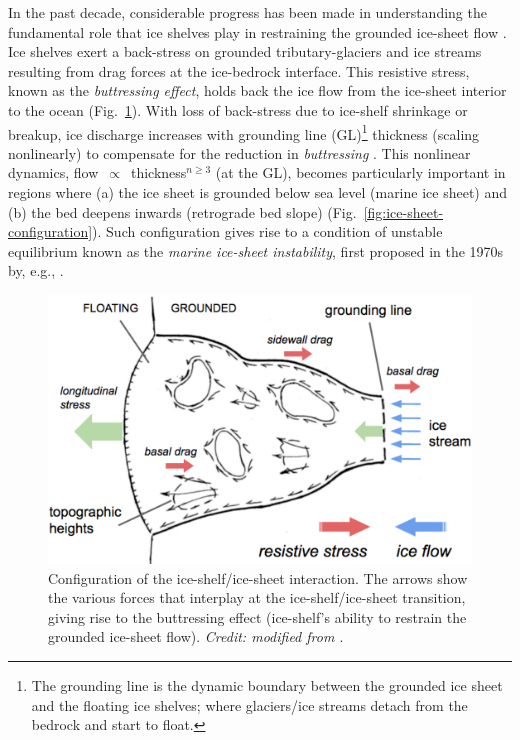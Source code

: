 In the past decade, considerable progress has been made in understanding the
fundamental role that ice shelves play in restraining the grounded ice-sheet
flow \parencite[e.g.,][]{Schoof2007, Goldberg2009, Gudmundsson2013}. Ice shelves exert a back-stress on grounded tributary-glaciers and ice streams resulting from drag forces
at the ice-bedrock interface. This resistive stress, known as the \emph{buttressing effect},
holds back the ice flow from the ice-sheet interior to the ocean (Fig.~\ref{fig:ice-shelf-buttressing}).
With loss of back-stress due to ice-shelf shrinkage or breakup, ice discharge
increases with grounding line (GL)\footnote{The grounding line
is the dynamic boundary between the grounded ice sheet and the floating ice shelves;
where glaciers/ice streams detach from the bedrock and start to float.} thickness (scaling nonlinearly) to
compensate for the reduction in \emph{buttressing} \parencite{Schoof2007, Joughin2012}. This nonlinear dynamics,
flow~$\propto$~thickness$^{n \geqslant 3}$ (at the GL), becomes particularly important in
regions where (a) the ice sheet is
grounded below sea level (marine ice sheet) and (b) the bed deepens inwards
(retrograde bed slope) (Fig.~\ref{fig:ice-sheet-configuration}). Such configuration gives rise to a condition of unstable
equilibrium known as the \emph{marine ice-sheet instability},
first proposed in the 1970s by, e.g., \textcite{Weertman1974, Mercer1978}.


\begin{figure}[!ht]
  \centering
  \includegraphics[width=.9\textwidth]{img/ice_shelf_buttressing.png}
  \caption[Schematic of ice-shelf buttressing]{
  Configuration of the ice-shelf/ice-sheet interaction. The arrows show the various forces that interplay at the ice-shelf/ice-sheet transition, giving rise to the buttressing effect (ice-shelf's ability to restrain the grounded ice-sheet flow). {\it Credit: modified from \textcite{Hughes2014}}.
  }
  \label{fig:ice-shelf-buttressing}
\end{figure}


